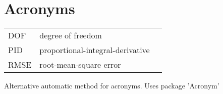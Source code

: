 
\chapter{Acronyms}
\label{chapter:abbrev}


\begin{tabular}{p{8em}ll}
	DOF & degree of freedom \\
	PID  & proportional-integral-derivative \\
	RMSE & root-mean-square error \\

\end{tabular}


Alternative automatic method for acronyms. Uses package 'Acronym'

\begin{acronym}[XXXXXX]
\end{acronym}
